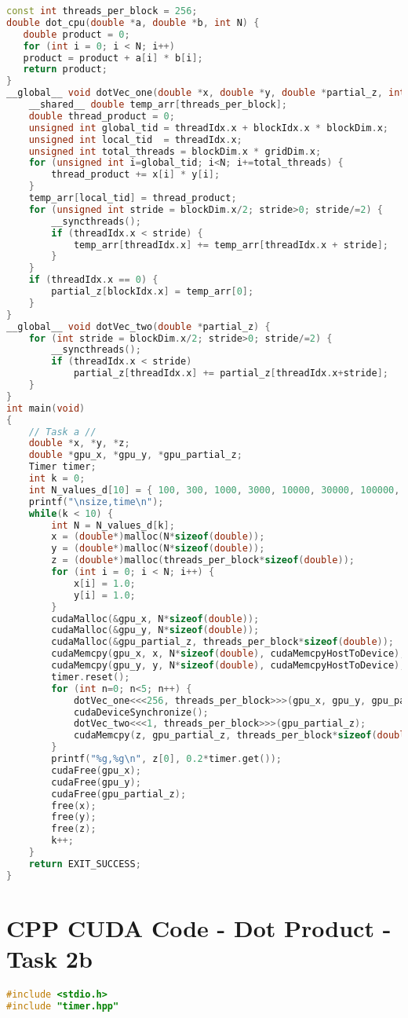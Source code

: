 \begin{appendix}
\begin{lstlisting}[language=C++, title=C++ Listing]
const int threads_per_block = 256;
double dot_cpu(double *a, double *b, int N) {
   double product = 0;
   for (int i = 0; i < N; i++)
   product = product + a[i] * b[i];
   return product;
}
__global__ void dotVec_one(double *x, double *y, double *partial_z, int N) {
	__shared__ double temp_arr[threads_per_block];
	double thread_product = 0;
	unsigned int global_tid = threadIdx.x + blockIdx.x * blockDim.x;
	unsigned int local_tid  = threadIdx.x;
	unsigned int total_threads = blockDim.x * gridDim.x;
	for (unsigned int i=global_tid; i<N; i+=total_threads) {
		thread_product += x[i] * y[i];
	}
	temp_arr[local_tid] = thread_product;
	for (unsigned int stride = blockDim.x/2; stride>0; stride/=2) {
		__syncthreads();
		if (threadIdx.x < stride) {
			temp_arr[threadIdx.x] += temp_arr[threadIdx.x + stride];
		}
	}
	if (threadIdx.x == 0) {
		partial_z[blockIdx.x] = temp_arr[0];
	}
}
__global__ void dotVec_two(double *partial_z) {
	for (int stride = blockDim.x/2; stride>0; stride/=2) {
		__syncthreads();
		if (threadIdx.x < stride)
			partial_z[threadIdx.x] += partial_z[threadIdx.x+stride];
	}
}
int main(void)
{
	// Task a //
	double *x, *y, *z;
	double *gpu_x, *gpu_y, *gpu_partial_z;
	Timer timer;
	int k = 0;
	int N_values_d[10] = { 100, 300, 1000, 3000, 10000, 30000, 100000, 300000, 1000000, 3000000 };
	printf("\nsize,time\n");
	while(k < 10) {
		int N = N_values_d[k];
		x = (double*)malloc(N*sizeof(double));
		y = (double*)malloc(N*sizeof(double));
		z = (double*)malloc(threads_per_block*sizeof(double));
		for (int i = 0; i < N; i++) {
			x[i] = 1.0;
			y[i] = 1.0;
		}
		cudaMalloc(&gpu_x, N*sizeof(double)); 
		cudaMalloc(&gpu_y, N*sizeof(double));
		cudaMalloc(&gpu_partial_z, threads_per_block*sizeof(double));
		cudaMemcpy(gpu_x, x, N*sizeof(double), cudaMemcpyHostToDevice);
		cudaMemcpy(gpu_y, y, N*sizeof(double), cudaMemcpyHostToDevice);
		timer.reset();
		for (int n=0; n<5; n++) { 
			dotVec_one<<<256, threads_per_block>>>(gpu_x, gpu_y, gpu_partial_z, N);	
			cudaDeviceSynchronize();
			dotVec_two<<<1, threads_per_block>>>(gpu_partial_z);
			cudaMemcpy(z, gpu_partial_z, threads_per_block*sizeof(double), cudaMemcpyDeviceToHost);
		}
		printf("%g,%g\n", z[0], 0.2*timer.get());
		cudaFree(gpu_x);
		cudaFree(gpu_y);
		cudaFree(gpu_partial_z);
		free(x);
		free(y);
		free(z);
		k++;	
	}
	return EXIT_SUCCESS;
}
\end{lstlisting}
\pagebreak

\section{CPP CUDA Code - Dot Product - Task 2b}
\label{app_2b}
\begin{lstlisting}[language=C++, title=C++ Listing]
#include <stdio.h>
#include "timer.hpp"


\end{lstlisting}
\end{appendix}
